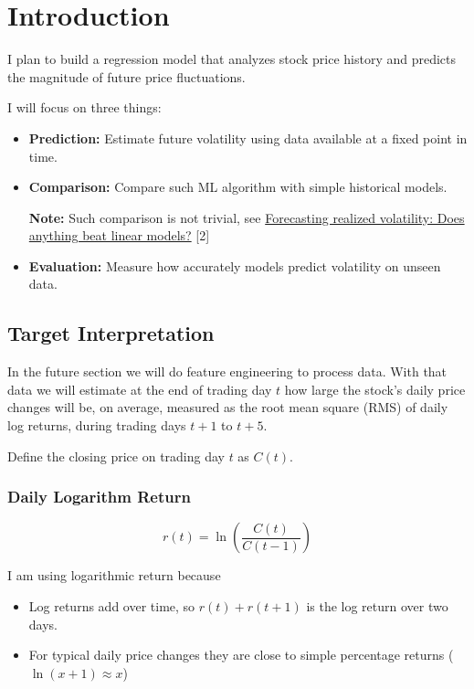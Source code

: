 \documentclass[11pt]{article}
\begin{document}
\section{Introduction}

I plan to build a regression model that analyzes stock price history and predicts the magnitude of future price fluctuations.

I will focus on three things:

\begin{itemize}
\item \textbf{Prediction:} Estimate future volatility using data available at a fixed point in time.
\item \textbf{Comparison:} Compare such ML algorithm with simple historical models.

\textbf{Note:} Such comparison is not trivial, see \href{https://www.sciencedirect.com/science/article/abs/pii/S0927539824000598}{Forecasting realized volatility: Does anything beat linear models?} [2]
\item \textbf{Evaluation:} Measure how accurately models predict volatility on unseen data.
\end{itemize}

\subsection{Target Interpretation}

In the future section we will do feature engineering to process data. With that data we will estimate at the end of trading day $t$ how large the stock's daily price changes will be, on average, measured as the root mean square (RMS) of daily log returns, during trading days $t+1$ to $t+5$.

Define the closing price on trading day $t$ as $C(t)$.

\subsubsection*{Daily Logarithm Return}
\[
r(t) = \ln\left(\frac{C(t)}{C(t-1)}\right)
\]

I am using logarithmic return because
\begin{itemize}
\item Log returns add over time, so $r(t) + r(t + 1)$ is the log return over two days.
\item For typical daily price changes they are close to simple percentage returns ($\ln(x + 1) \approx x$)
\end{itemize}
\end{document}
